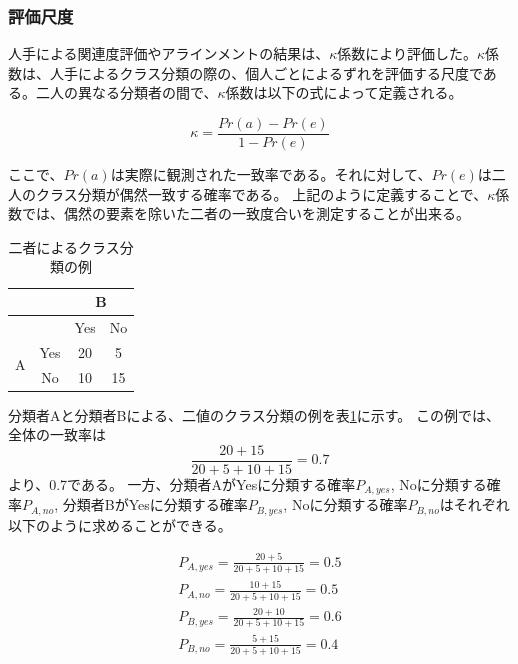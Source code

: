 \documentclass[12pt]{jarticle}
\begin{document}
\subsubsection{評価尺度}
\def\kappac{$\kappa$係数}

人手による関連度評価やアラインメントの結果は、\kappac\cite{kappa}により評価した。\kappac は、人手によるクラス分類の際の、個人ごとによるずれを評価する尺度である。二人の異なる分類者の間で、\kappac は以下の式によって定義される。

\begin{equation}
\kappa = \frac{Pr(a) - Pr(e)}{1 - Pr(e)}
\end{equation}

ここで、$Pr(a)$は実際に観測された一致率である。それに対して、$Pr(e)$は二人のクラス分類が偶然一致する確率である。
上記のように定義することで、\kappac では、偶然の要素を除いた二者の一致度合いを測定することが出来る。

\begin{table}
\begin{center}
\caption{二者によるクラス分類の例}
\label{classifi_2}
\begin{tabular}[t]{|c|c|c|c|}
  \hline
  \multirow{2}{*}{} & & \multicolumn{2}{|c|}{B} \\ \hline
                           &  & Yes & No \\ \hline
  \multirow{2}{*}{A} & Yes    & 20  &  5   \\ \cline{2-4}
                     & No     & 10  & 15  \\ \hline
\end{tabular}
\end{center}
\end{table}

分類者Aと分類者Bによる、二値のクラス分類の例を表\ref{classifi_2}に示す。
この例では、全体の一致率は
\begin{equation}
\frac{20 + 15}{20 + 5 + 10 + 15} = 0.7
\end{equation}
より、0.7である。
一方、分類者AがYesに分類する確率$P_{A,yes}$, Noに分類する確率$P_{A,no}$, 分類者BがYesに分類する確率$P_{B, yes}$, Noに分類する確率$P_{B, no}$はそれぞれ以下のように求めることができる。

\begin{eqnarray}
P_{A,yes} = \frac{20 +  5}{20 + 5 + 10 + 15} = 0.5\\
P_{A,no}  = \frac{10 + 15}{20 + 5 + 10 + 15} = 0.5\\
P_{B,yes} = \frac{20 + 10}{20 + 5 + 10 + 15} = 0.6\\
P_{B,no}  = \frac{ 5 + 15}{20 + 5 + 10 + 15} = 0.4
\end{eqnarray}
\end{document}
